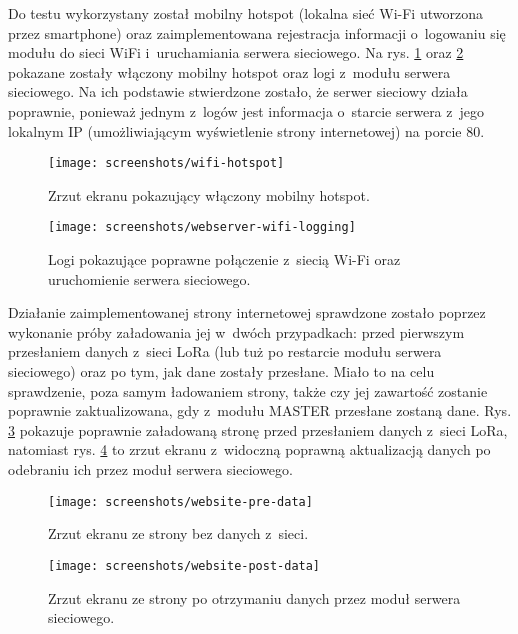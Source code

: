 Do testu wykorzystany został mobilny hotspot (lokalna sieć Wi-Fi utworzona przez smartphone) oraz zaimplementowana
rejestracja informacji o~logowaniu się modułu do sieci WiFi i~uruchamiania serwera sieciowego. Na rys.
\ref{img:wifi-hotspot} oraz \ref{img:webserver-wifi-logging} pokazane zostały włączony mobilny hotspot oraz logi
z~modułu serwera sieciowego. Na ich podstawie stwierdzone zostało, że serwer sieciowy działa poprawnie, ponieważ jednym
z~logów jest informacja o~starcie serwera z~jego lokalnym IP (umożliwiającym wyświetlenie strony internetowej) na porcie
80.

\begin{figure}[!htbp]
    \centering
    \texttt{[image: screenshots/wifi-hotspot]}
    \caption{\label{img:wifi-hotspot}Zrzut ekranu pokazujący włączony mobilny hotspot.}
\end{figure}

\begin{figure}[!htbp]
    \centering
    \texttt{[image: screenshots/webserver-wifi-logging]}
    \caption{\label{img:webserver-wifi-logging}Logi pokazujące poprawne połączenie z~siecią Wi-Fi oraz uruchomienie
        serwera sieciowego.}
\end{figure}

\FloatBarrier
Działanie zaimplementowanej strony internetowej sprawdzone zostało poprzez wykonanie próby załadowania jej w~dwóch
przypadkach: przed pierwszym przesłaniem danych z~sieci LoRa (lub tuż po restarcie modułu serwera sieciowego) oraz po
tym, jak dane zostały przesłane. Miało to na celu sprawdzenie, poza samym ładowaniem strony, także czy jej zawartość
zostanie poprawnie zaktualizowana, gdy z~modułu MASTER przesłane zostaną dane. Rys. \ref{img:website-pre-data} pokazuje
poprawnie załadowaną stronę przed przesłaniem danych z~sieci LoRa, natomiast rys. \ref{img:website-post-data} to zrzut
ekranu z~widoczną poprawną aktualizacją danych po odebraniu ich przez moduł serwera sieciowego.

\begin{figure}[!htbp]
    \centering
    \texttt{[image: screenshots/website-pre-data]}
    \caption{\label{img:website-pre-data}Zrzut ekranu ze strony bez danych z~sieci.}
\end{figure}

\begin{figure}[!htbp]
    \centering
    \texttt{[image: screenshots/website-post-data]}
    \caption{\label{img:website-post-data}Zrzut ekranu ze strony po otrzymaniu danych przez moduł serwera sieciowego.}
\end{figure}

